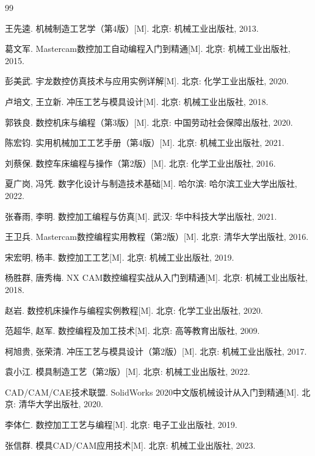 \documentclass{xautCADreport}
\begin{document}
\begin{thebibliography}{99}

王先逵. 机械制造工艺学（第4版）[M]. 北京: 机械工业出版社, 2013.

葛文军. Mastercam数控加工自动编程入门到精通[M]. 北京: 机械工业出版社, 2015.

彭美武. 宇龙数控仿真技术与应用实例详解[M]. 北京: 化学工业出版社, 2020.

卢培文, 王立新. 冲压工艺与模具设计[M]. 北京: 机械工业出版社, 2018.

郭铁良. 数控机床与编程（第3版）[M]. 北京: 中国劳动社会保障出版社, 2020.

陈宏钧. 实用机械加工工艺手册（第4版）[M]. 北京: 机械工业出版社, 2021.

刘蔡保. 数控车床编程与操作（第2版）[M]. 北京: 化学工业出版社, 2016.

夏广岗, 冯凭. 数字化设计与制造技术基础[M]. 哈尔滨: 哈尔滨工业大学出版社, 2022.

张春雨, 李明. 数控加工编程与仿真[M]. 武汉: 华中科技大学出版社, 2021.

王卫兵. Mastercam数控编程实用教程（第2版）[M]. 北京: 清华大学出版社, 2016.

宋宏明, 杨丰. 数控加工工艺[M]. 北京: 机械工业出版社, 2019.

杨胜群, 唐秀梅. NX CAM数控编程实战从入门到精通[M]. 北京: 机械工业出版社, 2018.

赵岩. 数控机床操作与编程实例教程[M]. 北京: 化学工业出版社, 2020.

范超华, 赵军. 数控编程及加工技术[M]. 北京: 高等教育出版社, 2009.


柯旭贵, 张荣清. 冲压工艺与模具设计（第2版）[M]. 北京: 机械工业出版社, 2017.

袁小江. 模具制造工艺（第2版）[M]. 北京: 机械工业出版社, 2022.

CAD/CAM/CAE技术联盟. SolidWorks 2020中文版机械设计从入门到精通[M]. 北京: 清华大学出版社, 2020.

李体仁. 数控加工工艺与编程[M]. 北京: 电子工业出版社, 2019.

张信群. 模具CAD/CAM应用技术[M]. 北京: 机械工业出版社, 2023.
\end{thebibliography}
\end{document}
